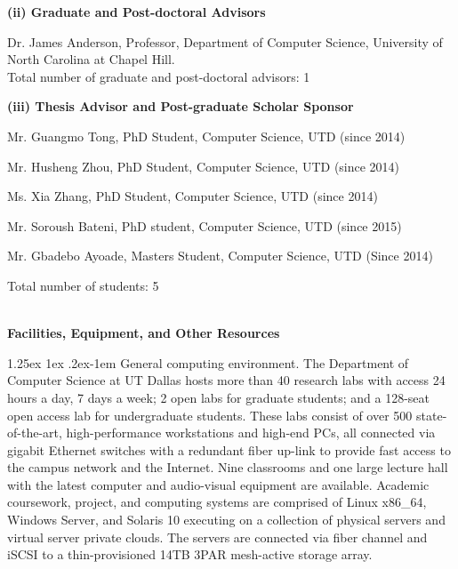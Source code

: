 \documentclass[10pt,letterpaper]{article}
\makeatletter
\renewcommand{\paragraph}{%
  \@startsection{paragraph}{4}%
  {\z@}{1.25ex \@plus 1ex \@minus .2ex}{-1em}%
  {\normalfont\normalsize\bfseries}%
}
\makeatother
\begin{document}
	\hspace{-4mm} \textbf{(ii) Graduate and Post-doctoral Advisors}\  
	\begin{changemargin}{8mm}{2mm}
	Dr. James Anderson, Professor, Department of Computer Science, University of North Carolina at Chapel Hill.\\
	Total number of graduate and post-doctoral advisors: 1
	\end{changemargin}
	
	\hspace{-4mm} \textbf{(iii) Thesis Advisor and Post-graduate Scholar Sponsor}\  
	\begin{changemargin}{8mm}{2mm}

	Mr. Guangmo Tong, PhD Student, Computer Science, UTD (since 2014)
	
	Mr. Husheng Zhou, PhD Student, Computer Science, UTD (since 2014)	
	
	Ms. Xia Zhang, PhD Student, Computer Science, UTD (since 2014)	
	
	Mr. Soroush Bateni, PhD student, Computer Science, UTD (since 2015)
	
	Mr. Gbadebo Ayoade, Masters Student, Computer Science, UTD (Since 2014) 
	
	Total number of students: 5


	\end{changemargin}


\newpage

%
\newpage


\begin{center}
\Large{\textbf{\\Facilities, Equipment, and Other Resources}}
\end{center}

\paragraph{General computing environment.} The Department of Computer Science at UT Dallas hosts more than 40 research labs with access 24 hours a day, 7 days a week; 2 open labs for graduate students; and a 128-seat open access lab for undergraduate students. These labs consist of over 500 state-of-the-art, high-performance workstations and high-end PCs, all connected via gigabit Ethernet switches with a redundant fiber up-link to provide fast access to the campus network and the Internet. Nine classrooms and one large lecture hall with the latest computer and audio-visual equipment are available. Academic coursework, project, and computing systems are comprised of Linux x86\_64, Windows Server, and Solaris 10 executing on a collection of physical servers and virtual server private clouds. The servers are connected via fiber channel and iSCSI to a thin-provisioned 14TB 3PAR mesh-active storage array. 
\end{document}
